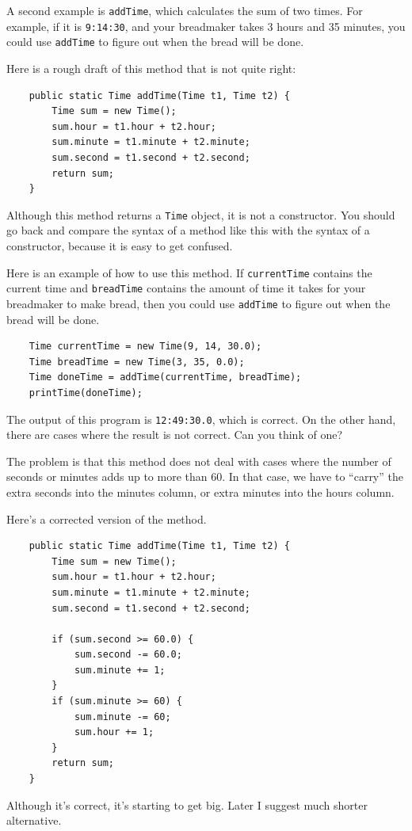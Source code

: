 \documentclass[12pt]{book}
\theoremstyle{exercise}
\begin{document}
A second example is {\tt addTime}, which calculates the sum of two
times.  For example, if it is {\tt 9:14:30}, and your breadmaker takes
3 hours and 35 minutes, you could use {\tt addTime} to figure out when
the bread will be done.

Here is a rough draft of this method that is not quite right:

\begin{lstlisting}
    public static Time addTime(Time t1, Time t2) {
        Time sum = new Time();
        sum.hour = t1.hour + t2.hour;
        sum.minute = t1.minute + t2.minute;
        sum.second = t1.second + t2.second;
        return sum;
    }
\end{lstlisting}
%
Although this method returns a {\tt Time} object, it is not
a constructor.  You should go back and compare the syntax of
a method like this with the syntax of a constructor, because
it is easy to get confused.

Here is an example of how to use this method.  If {\tt currentTime}
contains the current time and {\tt breadTime} contains the amount
of time it takes for your breadmaker to make bread, then you
could use {\tt addTime} to figure out when the bread will be
done.

\begin{lstlisting}
    Time currentTime = new Time(9, 14, 30.0);
    Time breadTime = new Time(3, 35, 0.0);
    Time doneTime = addTime(currentTime, breadTime);
    printTime(doneTime);
\end{lstlisting}
%
The output of this program is {\tt 12:49:30.0}, which is
correct.  On the other hand, there are cases where the result
is not correct.  Can you think of one?

The problem is that this method does not deal with cases
where the number of seconds or minutes adds up to more than
60.  In that case, we have to ``carry'' the extra seconds
into the minutes column, or extra minutes into the hours
column.

Here's a corrected version of the method.

\begin{lstlisting}
    public static Time addTime(Time t1, Time t2) {
        Time sum = new Time();
        sum.hour = t1.hour + t2.hour;
        sum.minute = t1.minute + t2.minute;
        sum.second = t1.second + t2.second;

        if (sum.second >= 60.0) {
            sum.second -= 60.0;
            sum.minute += 1;
        }
        if (sum.minute >= 60) {
            sum.minute -= 60;
            sum.hour += 1;
        }
        return sum;
    }
\end{lstlisting}
%
Although it's correct, it's starting to get big.  Later
I suggest much shorter alternative.
\end{document}
